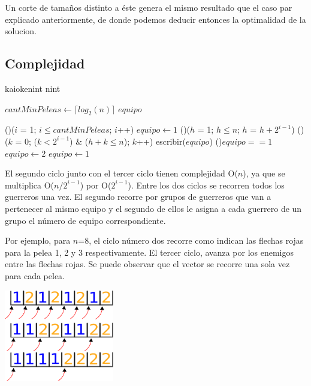         Un corte de tamaños distinto a éste genera el mismo resultado que el caso par explicado anteriormente, de donde podemos deducir entonces la optimalidad de la solucion. \;






    \subsection{Complejidad}

    \begin{algoritmo}{kaioken}{int n}{int}

   $cantMinPeleas \gets \lceil log_{2}(n) \rceil$ 
   $equipo$ 

  \For(){($i$ = 1; $i \leq cantMinPeleas$; $i$++)}{
    $equipo \gets 1$ 
    \For(){($h$ = 1; $h \leq n$; $h$ = $h + 2^{i-1}$)}{
      \For(){($k$ = 0; ($k < 2^{i-1}$) $\&$ ($h+k \leq n$); $k$++)}{
        escribir($equipo$) 
      }
        \eIf(){$equipo == 1$}{
          $equipo \gets 2$ \;
        }{
          $equipo \gets 1$ \;
        }
    }
  }


\end{algoritmo}

El segundo ciclo junto con el tercer ciclo tienen complejidad O($n$), ya que se multiplica O($n/2^{i-1}$) por O($2^{i-1}$). Entre los dos ciclos se recorren todos los guerreros una vez. El segundo recorre por grupos de guerreros que van a pertenecer al mismo equipo y el segundo de ellos le asigna a cada guerrero de un grupo el número de equipo correspondiente. 

Por ejemplo, para $n$=8, el ciclo número dos recorre como indican las flechas rojas para la pelea 1, 2 y 3 respectivamente. El tercer ciclo, avanza por los enemigos entre las flechas rojas. Se puede observar que el vector se recorre una sola vez para cada pelea. 


\includegraphics[height=4cm]{graficos/ciclo.png}




